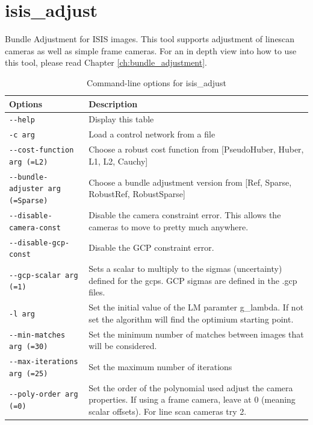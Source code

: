 
\section{isis\_adjust}

Bundle Adjustment for ISIS images. This tool supports adjustment of
linescan cameras as well as simple frame cameras. For an in depth view
into how to use this tool, please read Chapter
\ref{ch:bundle_adjustment}.

\begin{longtable}{|l|p{10cm}|}
\caption{Command-line options for isis\_adjust}
\label{tbl:isise_adjust}
\endfirsthead
\endhead
\endfoot
\endlastfoot
\hline
Options & Description \\ \hline \hline
\verb#--help# & Display this table \\ \hline
\verb#-c arg# & Load a control network from a file \\ \hline
\verb#--cost-function arg (=L2)# & Choose a robust cost function from [PseudoHuber, Huber, L1, L2, Cauchy] \\ \hline
\verb#--bundle-adjuster arg (=Sparse)# & Choose a bundle adjustment version from [Ref, Sparse, RobustRef, RobustSparse] \\ \hline
\verb#--disable-camera-const# & Disable the camera constraint error. This allows the cameras to move to pretty much anywhere. \\ \hline
\verb#--disable-gcp-const# & Disable the GCP constraint error. \\ \hline
\verb#--gcp-scalar arg (=1)# & Sets a scalar to multiply to the sigmas (uncertainty) defined for the gcps. GCP sigmas are defined in the .gcp files. \\ \hline
\verb#-l arg# & Set the initial value of the LM paramter g\_lambda. If not set the algorithm will find the optimium starting point. \\ \hline
\verb#--min-matches arg (=30)# & Set the minimum number of matches between images that will be considered. \\ \hline
\verb#--max-iterations arg (=25)# & Set the maximum number of iterations \\ \hline
\verb#--poly-order arg (=0)# & Set the order of the polynomial used adjust the camera properties. If using a frame camera, leave at 0 (meaning scalar offsets). For line scan cameras try 2. \\ \hline

\end{longtable}
